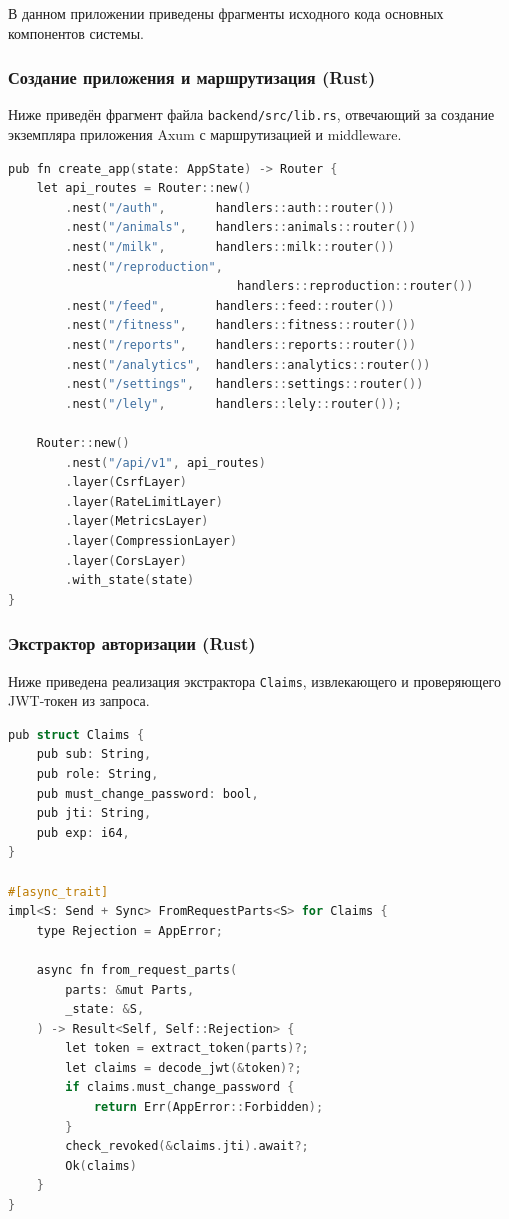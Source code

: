 
В данном приложении приведены фрагменты исходного кода основных компонентов системы.

\subsubsection{Создание приложения и маршрутизация (Rust)}

Ниже приведён фрагмент файла \texttt{backend/src/lib.rs}, отвечающий за создание экземпляра приложения Axum с маршрутизацией и middleware.

\begin{lstlisting}[language=C,basicstyle=\small\ttfamily]
pub fn create_app(state: AppState) -> Router {
    let api_routes = Router::new()
        .nest("/auth",       handlers::auth::router())
        .nest("/animals",    handlers::animals::router())
        .nest("/milk",       handlers::milk::router())
        .nest("/reproduction",
                                handlers::reproduction::router())
        .nest("/feed",       handlers::feed::router())
        .nest("/fitness",    handlers::fitness::router())
        .nest("/reports",    handlers::reports::router())
        .nest("/analytics",  handlers::analytics::router())
        .nest("/settings",   handlers::settings::router())
        .nest("/lely",       handlers::lely::router());

    Router::new()
        .nest("/api/v1", api_routes)
        .layer(CsrfLayer)
        .layer(RateLimitLayer)
        .layer(MetricsLayer)
        .layer(CompressionLayer)
        .layer(CorsLayer)
        .with_state(state)
}
\end{lstlisting}

\subsubsection{Экстрактор авторизации (Rust)}

Ниже приведена реализация экстрактора \texttt{Claims}, извлекающего и проверяющего JWT-токен из запроса.

\begin{lstlisting}[language=C,basicstyle=\small\ttfamily]
pub struct Claims {
    pub sub: String,
    pub role: String,
    pub must_change_password: bool,
    pub jti: String,
    pub exp: i64,
}

#[async_trait]
impl<S: Send + Sync> FromRequestParts<S> for Claims {
    type Rejection = AppError;

    async fn from_request_parts(
        parts: &mut Parts,
        _state: &S,
    ) -> Result<Self, Self::Rejection> {
        let token = extract_token(parts)?;
        let claims = decode_jwt(&token)?;
        if claims.must_change_password {
            return Err(AppError::Forbidden);
        }
        check_revoked(&claims.jti).await?;
        Ok(claims)
    }
}
\end{lstlisting}

